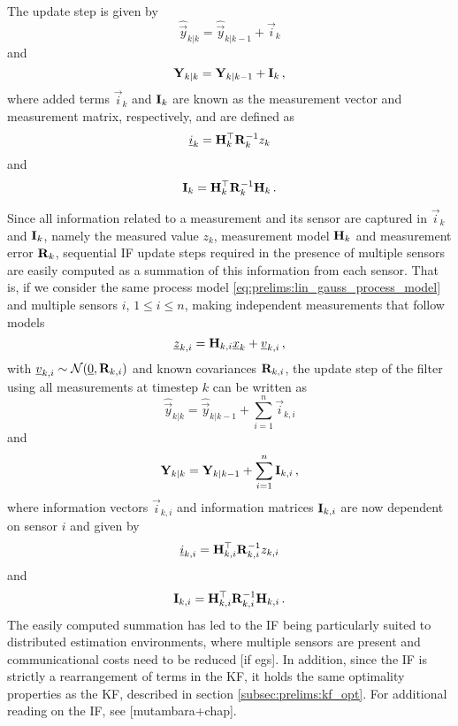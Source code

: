The update step is given by
\begin{equation}\label{eq:prelims:if_info_vec_update_single}
    \hat{\vec{y}}_{k|k} = \hat{\vec{y}}_{k|k-1} + \vec{i}_k
\end{equation}
and
\begin{equation}\label{eq:prelims:if_info_mat_update_single}
    {\ensuremath{{\mathbf{Y}}}}_{k|k} = {{\mathbf{Y}}}_{k|k-1} + {{\mathbf{I}}}_k\,,
\end{equation}
where added terms $\vec{i}_k$ and ${{\mathbf{I}}}_k$ are known as the measurement vector and measurement matrix, respectively, and are defined as
\begin{equation}
    {\underline{i}}_k = {{\mathbf{H}}}_k^\top{\ensuremath{{\mathbf{R}}}}_k^{-1}z_k
\end{equation}
and
\begin{equation}
    {\ensuremath{{\mathbf{I}}}}_k = {{\mathbf{H}}}_k^\top{\ensuremath{{\mathbf{R}}}}_k^{-1}{{\mathbf{H}}}_k\,.
\end{equation}

Since all information related to a measurement and its sensor are captured in $\vec{i}_k$ and ${{\mathbf{I}}}_k$, namely the measured value $z_k$, measurement model ${{\mathbf{H}}}_k$ and measurement error ${{\mathbf{R}}}_k$, sequential IF update steps required in the presence of multiple sensors are easily computed as a summation of this information from each sensor. That is, if we consider the same process model \eqref{eq:prelims:lin_gauss_process_model} and multiple sensors $i$, $1\leq i\leq n$, making independent measurements that follow models
\begin{equation}
    {\underline{z}}_{k,i} = {{\mathbf{H}}}_{k,i} {\underline{x}}_k + {\underline{v}}_{k,i}\,,
\end{equation}
with ${\underline{v}}_{k,i}\sim\mathcal{N}({\underline{0}},{{\mathbf{R}}}_{k,i})$ and known covariances ${{\mathbf{R}}}_{k,i}$, the update step of the filter using all measurements at timestep $k$ can be written as
\begin{equation}\label{eq:prelims:if_info_vec_update}
    \hat{\vec{y}}_{k|k} = \hat{\vec{y}}_{k|k-1} + \sum_{i=1}^n\vec{i}_{k,i}
\end{equation}
and
\begin{equation}\label{eq:prelims:if_info_mat_update}
    {\ensuremath{{\mathbf{Y}}}}_{k|k} = {{\mathbf{Y}}}_{k|k-1} + \sum_{i=1}^n{{\mathbf{I}}}_{k,i}\,,
\end{equation}
where information vectors $\vec{i}_{k,i}$ and information matrices ${{\mathbf{I}}}_{k,i}$ are now dependent on sensor $i$ and given by
\begin{equation}\label{eq:prelims:if_measurement_vec_defn}
    {\underline{i}}_{k,i} = {{\mathbf{H}}}_{k,i}^\top{\ensuremath{{\mathbf{R}}}}_{k,i}^{-1}z_{k,i}
\end{equation}
and
\begin{equation}\label{eq:prelims:if_measurement_mat_defn}
    {\ensuremath{{\mathbf{I}}}}_{k,i} = {{\mathbf{H}}}_{k,i}^\top{\ensuremath{{\mathbf{R}}}}_{k,i}^{-1}{{\mathbf{H}}}_{k,i}\,.
\end{equation}
The easily computed summation has led to the IF being particularly suited to distributed estimation environments, where multiple sensors are present and communicational costs need to be reduced [if egs]. In addition, since the IF is strictly a rearrangement of terms in the KF, it holds the same optimality properties as the KF, described in section \ref{subsec:prelims:kf_opt}. For additional reading on the IF, see [mutambara+chap].

